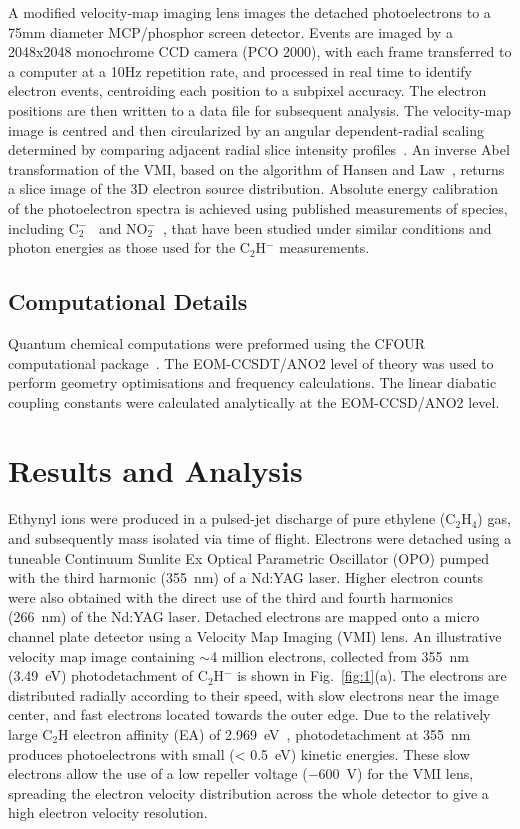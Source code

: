 \documentclass[aip,graphicx]{revtex4-1}
\begin{document}
A modified velocity-map imaging lens images the detached photoelectrons to a 75mm diameter MCP/phosphor screen detector. Events are imaged by a 2048x2048 monochrome CCD camera (PCO 2000), with each frame transferred to a computer at a 10Hz repetition rate, and processed in real time to identify electron events, centroiding each position to
a subpixel accuracy. The electron positions are then written to a data file for subsequent analysis. The velocity-map image is centred and then circularized by an angular dependent-radial scaling determined by comparing adjacent radial slice intensity profiles~\cite{gas17}. An inverse Abel transformation of the VMI, based on the algorithm of Hansen and Law~\cite{han85,hic19}, returns a slice image of the 3D electron source distribution. Absolute energy calibration of the photoelectron spectra is achieved using published measurements of species, including C$_2^-$~\cite{law19b} and NO$_2^-$~\cite{law19}, that have been studied under similar conditions and photon energies as those used for the C$_2$H$^-$ measurements.

\subsection{Computational Details}
Quantum chemical computations were preformed using the CFOUR computational package~\cite{dev20}. The EOM-CCSDT/ANO2 level of theory was used to perform geometry optimisations and frequency calculations. The linear diabatic coupling constants were calculated analytically at the EOM-CCSD/ANO2 level.

\section{Results and Analysis}
Ethynyl ions were produced in a pulsed-jet discharge of pure ethylene (C$_2$H$_4$) gas, and subsequently mass isolated via time of flight. Electrons were detached using a tuneable Continuum Sunlite Ex Optical Parametric Oscillator (OPO) pumped with the third harmonic (355~nm) of a Nd:YAG laser. Higher electron counts were also obtained with the direct use of the third and fourth harmonics (266~nm) of the Nd:YAG laser. Detached electrons are mapped onto a micro channel plate detector using a Velocity Map Imaging (VMI) lens. An illustrative velocity map image containing $\sim$4 million electrons, collected from 355~nm (3.49~eV) photodetachment of C$_2$H$^-$ is shown in Fig.~\ref{fig:1}(a). The electrons are distributed radially according to their speed, with slow electrons near the image center, and fast electrons located towards the outer edge. Due to the relatively large C$_2$H electron affinity (EA) of 2.969~eV~\cite{erv91}, photodetachment at 355~nm produces photoelectrons with small (< 0.5~eV) kinetic energies. These slow electrons allow the use of a low repeller voltage ($-600$~V) for the VMI lens, spreading the electron velocity distribution across the whole detector to give a high electron velocity resolution. 
\end{document}
